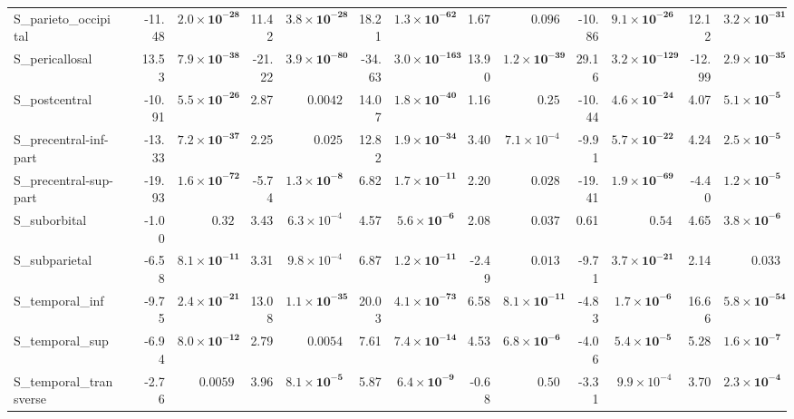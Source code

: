 {\begin{longtable}{llrrrrrrrrrrrr}
S\_parieto\_occipital &  & -11.48 & $\mathbf{2.0{\times}10^{-28}}$ & 11.42 & $\mathbf{3.8{\times}10^{-28}}$ & 18.21 & $\mathbf{1.3{\times}10^{-62}}$ & 1.67 & $0.096$ & -10.86 & $\mathbf{9.1{\times}10^{-26}}$ & 12.12 & $\mathbf{3.2{\times}10^{-31}}$ \\
S\_pericallosal &  & 13.53 & $\mathbf{7.9{\times}10^{-38}}$ & -21.22 & $\mathbf{3.9{\times}10^{-80}}$ & -34.63 & $\mathbf{3.0{\times}10^{-163}}$ & 13.90 & $\mathbf{1.2{\times}10^{-39}}$ & 29.16 & $\mathbf{3.2{\times}10^{-129}}$ & -12.99 & $\mathbf{2.9{\times}10^{-35}}$ \\
S\_postcentral &  & -10.91 & $\mathbf{5.5{\times}10^{-26}}$ & 2.87 & $0.0042$ & 14.07 & $\mathbf{1.8{\times}10^{-40}}$ & 1.16 & $0.25$ & -10.44 & $\mathbf{4.6{\times}10^{-24}}$ & 4.07 & $\mathbf{5.1{\times}10^{-5}}$ \\
S\_precentral-inf-part &  & -13.33 & $\mathbf{7.2{\times}10^{-37}}$ & 2.25 & $0.025$ & 12.82 & $\mathbf{1.9{\times}10^{-34}}$ & 3.40 & $7.1{\times}10^{-4}$ & -9.91 & $\mathbf{5.7{\times}10^{-22}}$ & 4.24 & $\mathbf{2.5{\times}10^{-5}}$ \\
S\_precentral-sup-part &  & -19.93 & $\mathbf{1.6{\times}10^{-72}}$ & -5.74 & $\mathbf{1.3{\times}10^{-8}}$ & 6.82 & $\mathbf{1.7{\times}10^{-11}}$ & 2.20 & $0.028$ & -19.41 & $\mathbf{1.9{\times}10^{-69}}$ & -4.40 & $\mathbf{1.2{\times}10^{-5}}$ \\
S\_suborbital &  & -1.00 & $0.32$ & 3.43 & $6.3{\times}10^{-4}$ & 4.57 & $\mathbf{5.6{\times}10^{-6}}$ & 2.08 & $0.037$ & 0.61 & $0.54$ & 4.65 & $\mathbf{3.8{\times}10^{-6}}$ \\
S\_subparietal &  & -6.58 & $\mathbf{8.1{\times}10^{-11}}$ & 3.31 & $9.8{\times}10^{-4}$ & 6.87 & $\mathbf{1.2{\times}10^{-11}}$ & -2.49 & $0.013$ & -9.71 & $\mathbf{3.7{\times}10^{-21}}$ & 2.14 & $0.033$ \\
S\_temporal\_inf &  & -9.75 & $\mathbf{2.4{\times}10^{-21}}$ & 13.08 & $\mathbf{1.1{\times}10^{-35}}$ & 20.03 & $\mathbf{4.1{\times}10^{-73}}$ & 6.58 & $\mathbf{8.1{\times}10^{-11}}$ & -4.83 & $\mathbf{1.7{\times}10^{-6}}$ & 16.66 & $\mathbf{5.8{\times}10^{-54}}$ \\
S\_temporal\_sup &  & -6.94 & $\mathbf{8.0{\times}10^{-12}}$ & 2.79 & $0.0054$ & 7.61 & $\mathbf{7.4{\times}10^{-14}}$ & 4.53 & $\mathbf{6.8{\times}10^{-6}}$ & -4.06 & $\mathbf{5.4{\times}10^{-5}}$ & 5.28 & $\mathbf{1.6{\times}10^{-7}}$ \\
S\_temporal\_transverse &  & -2.76 & $0.0059$ & 3.96 & $\mathbf{8.1{\times}10^{-5}}$ & 5.87 & $\mathbf{6.4{\times}10^{-9}}$ & -0.68 & $0.50$ & -3.31 & $9.9{\times}10^{-4}$ & 3.70 & $\mathbf{2.3{\times}10^{-4}}$ \\

\end{longtable}}
